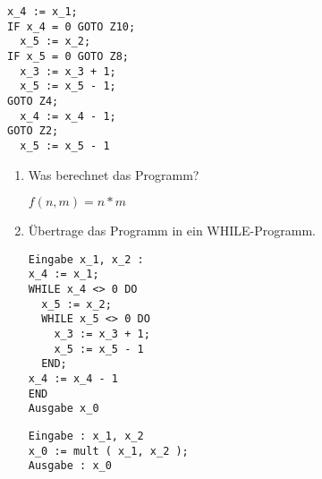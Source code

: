 \documentclass{bschlangaul-aufgabe}
\begin{document}
\begin{enumerate}
\begin{verbatim}
x_4 := x_1;
IF x_4 = 0 GOTO Z10;
  x_5 := x_2;
IF x_5 = 0 GOTO Z8;
  x_3 := x_3 + 1;
  x_5 := x_5 - 1;
GOTO Z4;
  x_4 := x_4 - 1;
GOTO Z2;
  x_5 := x_5 - 1
\end{verbatim}
\begin{enumerate}


\item Was berechnet das Programm?

\begin{liAntwort}
$f(n, m) = n * m$
\end{liAntwort}


\item Übertrage das Programm in ein WHILE-Programm.

\begin{liAntwort}
\begin{verbatim}
Eingabe x_1, x_2 :
x_4 := x_1;
WHILE x_4 <> 0 DO
  x_5 := x_2;
  WHILE x_5 <> 0 DO
    x_3 := x_3 + 1;
    x_5 := x_5 - 1
  END;
x_4 := x_4 - 1
END
Ausgabe x_0

\end{verbatim}

\begin{verbatim}
Eingabe : x_1, x_2
x_0 := mult ( x_1, x_2 );
Ausgabe : x_0
\end{verbatim}
\end{liAntwort}
\end{enumerate}

\end{enumerate}
\end{document}
